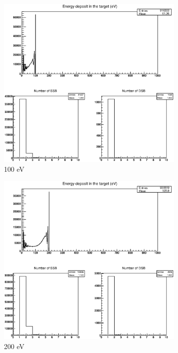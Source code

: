 \begin{figure}
\centering
\begin{subfigure}{.5\textwidth}
  \centering
  \includegraphics[width=.78\linewidth]{./Figures/1zbbe100ev.eps}
  \caption{100 eV}
  \label{fig:subei1}
\end{subfigure}%
\begin{subfigure}{.5\textwidth}
  \centering
  \includegraphics[width=.78\linewidth]{./Figures/1zbbe200ev.eps}
  \caption{200 eV}
  \label{fig:subei2}
\end{subfigure}
\begin{subfigure}{.5\textwidth}
  \centering

\end{subfigure}
\end{figure}
